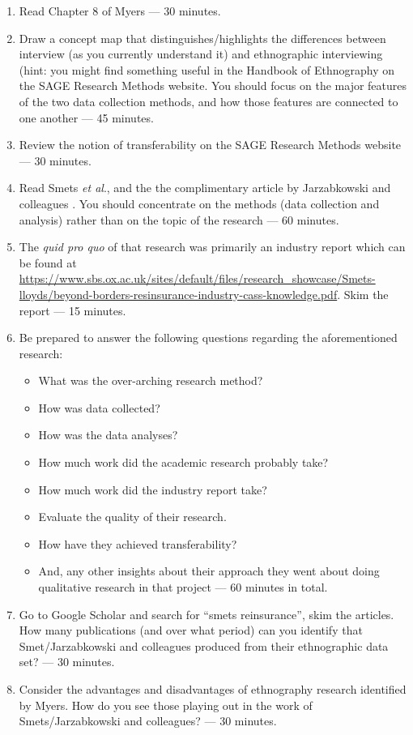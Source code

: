 \documentclass[]{book}
\providecommand{\tightlist}{%
  \setlength{\itemsep}{0pt}\setlength{\parskip}{0pt}}
\theoremstyle{definition}
\theoremstyle{definition}
\theoremstyle{definition}
\theoremstyle{remark}
\begin{document}
\begin{enumerate}
\def\labelenumi{\arabic{enumi}.}
\item
  Read Chapter 8 of Myers \autocite*[
  p.~92--103]{myers_2013_qualitativeresearchbusiness} --- 30 minutes.
\item
  Draw a concept map that distinguishes/highlights the differences
  between interview (as you currently understand it) and ethnographic
  interviewing (hint: you might find something useful in the Handbook of
  Ethnography on the SAGE Research Methods website. You should focus on
  the major features of the two data collection methods, and how those
  features are connected to one another --- 45 minutes.
\item
  Review the notion of transferability on the SAGE Research Methods
  website --- 30 minutes.
\item
  Read Smets \emph{et al}.,
  \autocite{smets_2015_reinsurancetradinglloyd} and the the
  complimentary article by Jarzabkowski and colleagues
  \autocite{jarzabkowski_2015_conductingglobalteambased}. You should
  concentrate on the methods (data collection and analysis) rather than
  on the topic of the research --- 60 minutes.
\item
  The \emph{quid pro quo} of that research was primarily an industry
  report which can be found at
  \url{https://www.sbs.ox.ac.uk/sites/default/files/research_showcase/Smets-lloyds/beyond-borders-resinsurance-industry-cass-knowledge.pdf}.
  Skim the report --- 15 minutes.
\item
  Be prepared to answer the following questions regarding the
  aforementioned research:

  \begin{itemize}
  \tightlist
  \item
    What was the over-arching research method?
  \item
    How was data collected?
  \item
    How was the data analyses?
  \item
    How much work did the academic research probably take?
  \item
    How much work did the industry report take?
  \item
    Evaluate the quality of their research.
  \item
    How have they achieved transferability?
  \item
    And, any other insights about their approach they went about doing
    qualitative research in that project --- 60 minutes in total.
  \end{itemize}
\item
  Go to Google Scholar and search for ``smets reinsurance'', skim the
  articles. How many publications (and over what period) can you
  identify that Smet/Jarzabkowski and colleagues produced from their
  ethnographic data set? --- 30 minutes.
\item
  Consider the advantages and disadvantages of ethnography research
  identified by Myers. How do you see those playing out in the work of
  Smets/Jarzabkowski and colleagues? --- 30 minutes.
\end{enumerate}
\end{document}
